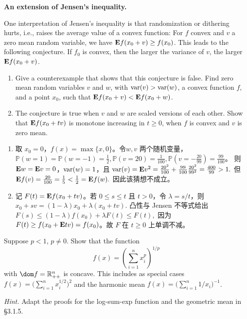 \documentclass{ctexart}
\begin{document}
\begin{problem}\label{3.10}
  \textbf{An extension of Jensen's inequality.}

  One interpretation of Jensen's inequality is that randomization or dithering hurts,
  i.e., raises the average value of a convex function: For $f$ convex and $v$ a zero
  mean random variable, we have $\mathbf{E} f(x_0+v)\geq f(x_0)$. This leads to the following
  conjecture. If $f_0$ is convex, then the larger the variance of $v$, the larger
  $\mathbf{E} f(x_0+v)$.
  \begin{enumerate}
    \item Give a counterexample that shows that this conjecture is false. Find zero mean
      random variables $v$ and $w$, with $\operatorname{var}(v)>\operatorname{var}(w)$, a convex function $f$, and a
      point $x_0$, such that $\mathbf{E} f(x_0+v)<\mathbf{E} f(x_0+w)$.

    \item The conjecture is true when $v$ and $w$ are scaled versions of each other.
      Show that $\mathbf{E} f(x_0+tv)$ is monotone increasing in $t\geq0$, when $f$ is convex and
      $v$ is zero mean.
  \end{enumerate}
\end{problem}
\begin{solution}
  \begin{enumerate}
    \item 取 $x_0=0$，$f(x)=\max\{x,0\}$。令\(w,v \) 两个随机变量，
      \(\mathbb{P}(w=1)=\mathbb{P}(w=-1)=\frac{1}{2}, \mathbb{P}(v=20)=\frac{1}{100},\mathbb{P}(v= - \frac{20}{99})=\frac{99}{100} \)。
      则 $\mathbf{E} w=\mathbf{E} v=0$，$\operatorname{var}(w)=1$，且
      \(
        \operatorname{var}(v)=\mathbf{E} v^2=\frac{20^2}{100}+\frac{99}{100}\frac{20^2}{99^2}
        =\frac{400}{99}>1.
      \)
      但
      \(
        \mathbf{E} f(v)=\frac{20}{100}=\frac15<\frac12=\mathbf{E} f(w).
      \)
      因此该猜想不成立。

    \item 记 $F(t)=\mathbf{E} f(x_0+tv)$。若 $0\leq s\leq t$ 且 $t>0$，令
      $\lambda=s/t$，则
      \(
        x_0+sv=(1-\lambda)x_0+\lambda(x_0+tv).
      \)
      凸性与 Jensen 不等式给出
      \(
        F(s)\leq (1-\lambda)f(x_0)+\lambda F(t)\leq F(t),
      \)
      因为 $F(t)\geq f(x_0+\mathbf{E} tv)=f(x_0)$。故 $F$ 在 $t\geq0$ 上单调不减。
  \end{enumerate}
\end{solution}

\begin{problem}\label{3.17}
  Suppose $p<1$, $p\neq0$. Show that the function
  \[
    f(x)=\left(\sum_{i=1}^{n}x_i^p\right)^{1/p}
  \]
  with $\dom f=\mathbb{R}_{++}^{n}$ is concave. This includes as special cases
  $f(x)=\bigl(\sum_{i=1}^{n}x_i^{1/2}\bigr)^2$ and the harmonic mean
  $f(x)=\bigl(\sum_{i=1}^{n}1/x_i\bigr)^{-1}$.

  \textit{Hint.} Adapt the proofs for the log-sum-exp function and the geometric mean in
  \S3.1.5.
\end{problem}
\end{document}
